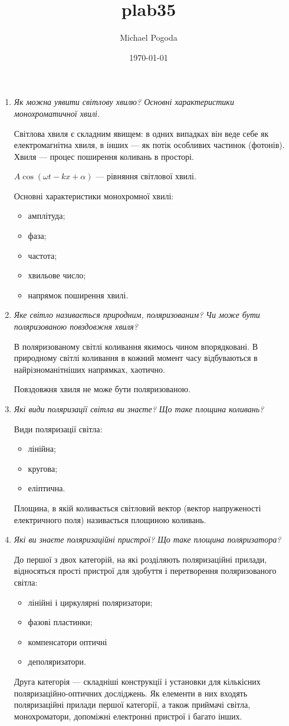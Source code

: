 \documentclass[a4paper,10pt,notitlepage,pdftex,headsepline]{scrartcl}
\author{Michael Pogoda}
\title{plab35}
\date{\today}
\begin{document}
\begin{enumerate}
\item \textit{Як можна уявити світлову хвилю?
Основні характеристики монохроматичної хвилі.}

Світлова хвиля є складним явищем: в одних випадках він веде себе як електромагнітна хвиля, в інших --- як потік особливих частинок (фотонів).
Хвиля --- процес поширення коливань в просторі.

$A\cos\left(\omega t - kx + \alpha\right)$ --- рівняння світлової хвилі.

Основні характеристики монохромної хвилі:
\begin{itemize}
\item амплітуда;
\item фаза;
\item частота;
\item хвильове число;
\item напрямок поширення хвилі.
\end{itemize}
\item \textit{Яке світло називається природним, поляризованим? Чи може бути поляризованою повздовжня хвиля?}

В поляризованому світлі коливання якимось чином впорядковані.
В природному світлі коливання в кожний момент часу відбуваються в найрізноманітніших напрямках, хаотично.

Повздовжня хвиля не може бути поляризованою.
\item \textit{Які види поляризації світла ви знаєте?
Що таке площина коливань?}

Види поляризації світла:
\begin{itemize}
\item лінійна;
\item кругова;
\item еліптична.
\end{itemize}

Площина, в якій коливається світловий вектор (вектор напруженості електричного поля) називається площиною коливань.
\item \textit{Які ви знаєте поляризаційні пристрої? Що таке площина поляризатора?}

До першої з двох категорій, на які розділяють поляризаційні прилади, відносяться прості пристрої для здобуття і перетворення поляризованого світла:
\begin{itemize}
\item лінійні і циркулярні поляризатори;
\item фазові пластинки;
\item компенсатори оптичні
\item деполяризатори.
\end{itemize}
Друга категорія --- складніші конструкції і установки для кількісних поляризаційно-оптичних досліджень.
Як елементи в них входять поляризаційні прилади першої категорії, а також приймачі світла, монохроматори, допоміжні електронні пристрої і багато інших.


\end{enumerate}
\end{document}
